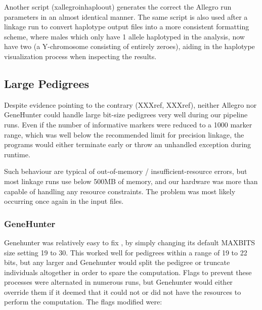 Another script (xallegroinhaploout) generates the correct the Allegro run parameters in an almost identical manner. The same script is also used after a linkage run to convert haplotype output files into a more consistent formatting scheme, where males which only have 1 allele haplotyped in the analysis, now have two (a Y-chromosome consisting of entirely zeroes), aiding in the haplotype visualization process when inspecting the results.


\subsection{Large Pedigrees}\label{ref:meth:largepeds}

Despite evidence pointing to the contrary (XXXref, XXXref), neither Allegro nor GeneHunter could handle large bit-size pedigrees very well during our pipeline runs. Even if the number of informative markers were reduced to a 1000 marker range, which was well below the recommended limit for precision linkage, the programs would either terminate early or throw an unhandled exception during runtime. 

Such behaviour are typical of out-of-memory / insufficient-resource errors, but most linkage runs use below 500MB of memory, and our hardware was more than capable of handling any resource constraints. The problem was most likely occurring once again in the input files.

\subsubsection{GeneHunter}

Genehunter was relatively easy to fix , by simply changing its default MAXBITS size setting 19 to 30. This worked well for pedigrees within a range of 19 to 22 bits, but any larger and Genehunter would split the pedigree or truncate individuals altogether in order to spare the computation. Flags to prevent these processes were alternated in numerous runs, but Genehunter would either override them if it deemed that it could not or did not have the resources  to perform the computation. The flags modified were:

